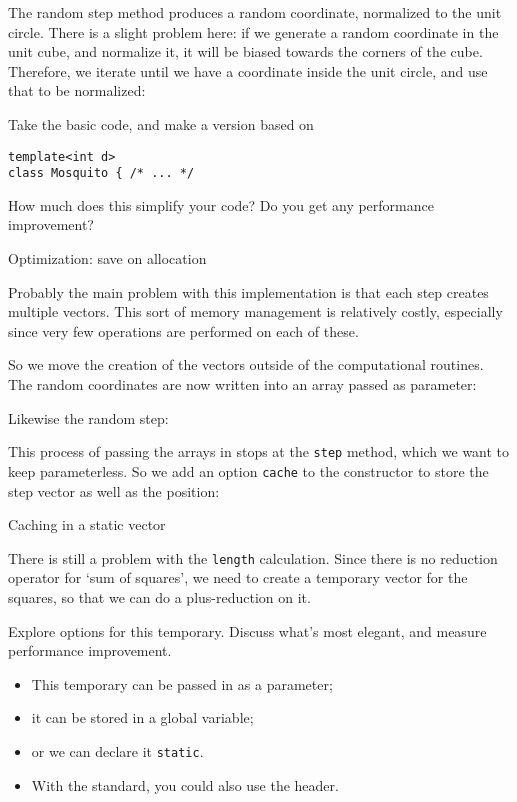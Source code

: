 The random step method produces a random coordinate,
normalized to the unit circle.
There is a slight problem here:
if we generate a random coordinate in the unit cube,
and normalize it, it will be biased towards the corners of the cube.
Therefore, we iterate until we have a coordinate inside the unit circle,
and use that to be normalized:
%

\begin{exercise}
  Take the basic code, and make a version based on
\begin{lstlisting}
template<int d>
class Mosquito { /* ... */
\end{lstlisting}
  How much does this simplify your code? Do you get any performance improvement?
\end{exercise}

 {Optimization: save on allocation}

Probably the main problem with this implementation
is that each step creates multiple vectors.
This sort of memory management is relatively costly,
especially since very few operations are performed
on each of these.

So we move the creation of the vectors outside of the computational routines.
The random coordinates are now written into an array passed as parameter:
%

Likewise the random step:
%

This process of passing the arrays in
stops at the \lstinline{step} method,
which we want to keep parameterless.
So we add an option \lstinline{cache} to the constructor
to store the step vector as well as the position:
%


 {Caching in a static vector}

There is still a problem with the \lstinline{length} calculation.
Since there is no reduction operator for `sum of squares',
we need to create a temporary vector for the squares,
so that we can do a plus-reduction on it.

\begin{exercise}
  Explore options for this temporary. Discuss what's most elegant,
  and measure performance improvement.
  \begin{itemize}
  \item
    This temporary can be passed in as a parameter;
  \item
    it can be stored in a global variable;
  \item 
    or we can declare it \lstinline{static}.
  \item With the  standard,
    you could also use the  header.
  \end{itemize}
\end{exercise}

